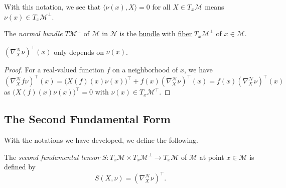With this notation, we see that \(\langle \nu (x), X \rangle = 0\) for all \(X\in T_x \mathcal{M} \) means \(\nu (x)\in T_x \mathcal{M} ^{\perp} \).

\begin{notation}\label{not:normal-bundle}
	The \emph{normal bundle} \(T \mathcal{M} ^{\perp} \) of \(\mathcal{M} \) in \(\mathcal{N} \) is the \hyperref[def:bundle]{bundle} with \hyperref[def:fiber]{fiber} \(T_x \mathcal{M} ^{\perp} \) of \(x\in \mathcal{M} \).
\end{notation}

\begin{lemma}
	\((\nabla _X ^\mathcal{N} \nu )^{\top}(x)\) only depends on \(\nu (x)\).
\end{lemma}
\begin{proof}
	For a real-valued function \(f\) on a neighborhood of \(x\), we have
	\[
		(\nabla _X ^\mathcal{N} f \nu )^{\top}(x)
		= \big( X(f)(x) \nu (x) \big) ^{\top} + f(x) (\nabla _X ^\mathcal{N} \nu )^{\top} (x)
		= f(x) (\nabla _X ^\mathcal{N} \nu )^{\top} (x)
	\]
	as \(\big( X(f)(x) \nu (x) \big) ^{\top} = 0\) with \(\nu (x) \in T_x \mathcal{M} ^{\top} \).
\end{proof}

\subsection{The Second Fundamental Form}
With the notations we have developed, we define the following.

\begin{definition}\label{def:2nd-fundamental-tensor}
	The \emph{second fundamental tensor} \(S\colon T_x \mathcal{M} \times T_x \mathcal{M} ^{\perp} \to T_x \mathcal{M} \) of \(\mathcal{M} \) at point \(x\in \mathcal{M} \) is defined by
	\[
		S(X, \nu ) = (\nabla ^\mathcal{N} _X \nu )^{\top}.
	\]
\end{definition}

